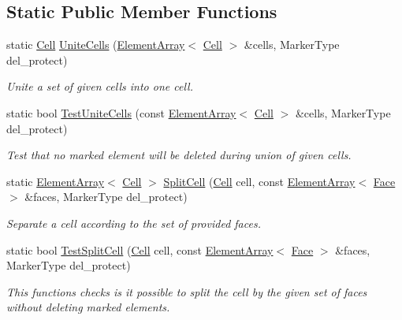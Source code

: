\subsection*{Static Public Member Functions}
\begin{DoxyCompactItemize}
\item 
static \hyperlink{classINMOST_1_1Cell}{Cell} \hyperlink{classINMOST_1_1Cell_a7f38ec05ba41d633d48bf05cdf2d0aad}{Unite\-Cells} (\hyperlink{classINMOST_1_1ElementArray}{Element\-Array}$<$ \hyperlink{classINMOST_1_1Cell}{Cell} $>$ \&cells, Marker\-Type del\-\_\-protect)
\begin{DoxyCompactList}\small\item\em Unite a set of given cells into one cell. \end{DoxyCompactList}\item 
static bool \hyperlink{classINMOST_1_1Cell_a874821b6ed2fd2907509146651312062}{Test\-Unite\-Cells} (const \hyperlink{classINMOST_1_1ElementArray}{Element\-Array}$<$ \hyperlink{classINMOST_1_1Cell}{Cell} $>$ \&cells, Marker\-Type del\-\_\-protect)
\begin{DoxyCompactList}\small\item\em Test that no marked element will be deleted during union of given cells. \end{DoxyCompactList}\item 
static \hyperlink{classINMOST_1_1ElementArray}{Element\-Array}$<$ \hyperlink{classINMOST_1_1Cell}{Cell} $>$ \hyperlink{classINMOST_1_1Cell_afd127d2e41a4b4362dc3399d9ac96a59}{Split\-Cell} (\hyperlink{classINMOST_1_1Cell}{Cell} cell, const \hyperlink{classINMOST_1_1ElementArray}{Element\-Array}$<$ \hyperlink{classINMOST_1_1Face}{Face} $>$ \&faces, Marker\-Type del\-\_\-protect)
\begin{DoxyCompactList}\small\item\em Separate a cell according to the set of provided faces. \end{DoxyCompactList}\item 
static bool \hyperlink{classINMOST_1_1Cell_ae48af9bae603442a3dccc81e39b18eb0}{Test\-Split\-Cell} (\hyperlink{classINMOST_1_1Cell}{Cell} cell, const \hyperlink{classINMOST_1_1ElementArray}{Element\-Array}$<$ \hyperlink{classINMOST_1_1Face}{Face} $>$ \&faces, Marker\-Type del\-\_\-protect)
\begin{DoxyCompactList}\small\item\em This functions checks is it possible to split the cell by the given set of faces without deleting marked elements. \end{DoxyCompactList}\end{DoxyCompactItemize}
